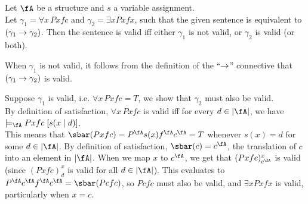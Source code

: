 \begin{Answer}
  \bigskip

  \step
  Let $\fA$ be a structure and $s$ a variable assignment.\\
  Let $\gamma_1 = \forall x\,  Pxfc$ and $\gamma_2 = \exists x Pxfx$,
  such that the given sentence is equivalent to
  $(\gamma_1 \rightarrow \gamma_2)$.
  Then the sentence is valid iff either $\gamma_1$ is not valid,
  or $\gamma_2$ is valid (or both).

  \step
  When $\gamma_1$ is not valid, it follows from the definition of the
  ``$\rightarrow$'' connective that $(\gamma_1 \rightarrow \gamma_2)$ is valid.
  
  \step
  Suppose $\gamma_1$ is valid, i.e. $\forall x\,  Pxfc = T$,
  we show that $\gamma_2$ must also be valid.\\
  By definition of satisfaction, $\forall x\,  Pxfc$ is valid iff
  for every $d \in \abs{\fA}$, we have $\models_\fA Pxfc \; [s(x \mid d)]$.\\
  This means that $\sbar(Pxfc) = P^\fA s(x) f^\fA c^\fA = T$ whenever
  $s(x) = d$ for some $d \in \abs{\fA}$.
  By definition of satisfaction, $\sbar(c) = c^\fA$, the translation of $c$
  into an element in $\abs{\fA}$.
  When we map $x$ to $c^\fA$, we get that $(Pxfc)^x_{c^{\fA}}$ is valid
  (since $(P x fc)^x_d$ is valid for all $d \in \abs{\fA}$).
  This evaluates to $P^\fA c^\fA f^\fA c^\fA = \sbar(Pcfc)$,
  so $Pcfc$ must also be valid, and
  $\exists x Pxfx$ is valid, particularly when $x = c$.
\end{Answer}
